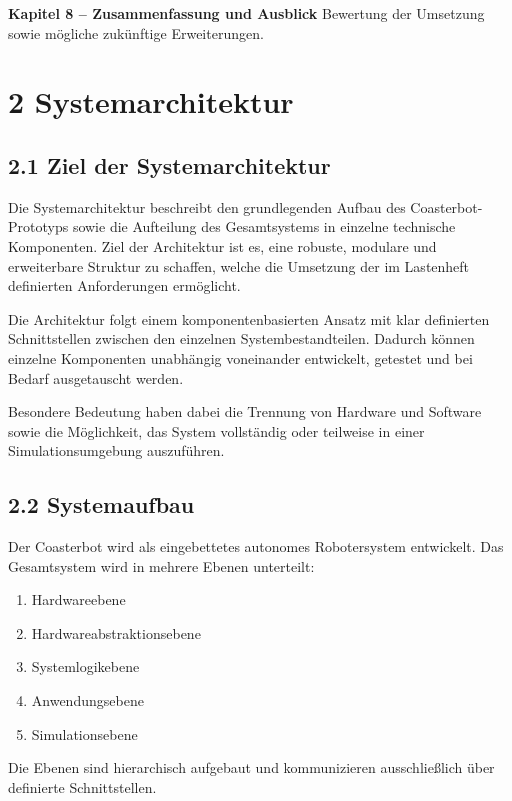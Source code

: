 \documentclass[
]{article}
\providecommand{\tightlist}{%
  \setlength{\itemsep}{0pt}\setlength{\parskip}{0pt}}
\begin{document}
\textbf{Kapitel 8 -- Zusammenfassung und Ausblick} Bewertung der
Umsetzung sowie mögliche zukünftige Erweiterungen.

\section{2 Systemarchitektur}\label{systemarchitektur}

\subsection{2.1 Ziel der
Systemarchitektur}\label{ziel-der-systemarchitektur}

Die Systemarchitektur beschreibt den grundlegenden Aufbau des
Coasterbot-Prototyps sowie die Aufteilung des Gesamtsystems in einzelne
technische Komponenten. Ziel der Architektur ist es, eine robuste,
modulare und erweiterbare Struktur zu schaffen, welche die Umsetzung der
im Lastenheft definierten Anforderungen ermöglicht.

Die Architektur folgt einem komponentenbasierten Ansatz mit klar
definierten Schnittstellen zwischen den einzelnen Systembestandteilen.
Dadurch können einzelne Komponenten unabhängig voneinander entwickelt,
getestet und bei Bedarf ausgetauscht werden.

Besondere Bedeutung haben dabei die Trennung von Hardware und Software
sowie die Möglichkeit, das System vollständig oder teilweise in einer
Simulationsumgebung auszuführen.

\subsection{2.2 Systemaufbau}\label{systemaufbau}

Der Coasterbot wird als eingebettetes autonomes Robotersystem
entwickelt. Das Gesamtsystem wird in mehrere Ebenen unterteilt:

\begin{enumerate}
\def\labelenumi{\arabic{enumi}.}
\tightlist
\item
  Hardwareebene
\item
  Hardwareabstraktionsebene
\item
  Systemlogikebene
\item
  Anwendungsebene
\item
  Simulationsebene
\end{enumerate}

Die Ebenen sind hierarchisch aufgebaut und kommunizieren ausschließlich
über definierte Schnittstellen.
\end{document}
